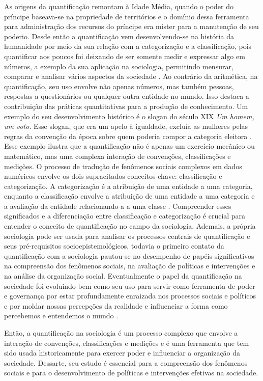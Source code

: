As origens da quantificação remontam à Idade Média, quando o poder do príncipe baseava-se na propriedade de territórios e o domínio dessa ferramenta para administração dos recursos do príncipe era mister para a manutenção de seu poderio. Desde então a quantificação vem desenvolvendo-se na história da humanidade por meio da sua relação com a categorização e a classificação, pois quantificar aos poucos foi deixando de ser somente medir e expressar algo em números, a exemplo da sua aplicação na sociologia, permitindo mensurar, comparar e analisar vários aspectos da sociedade \cite{camargo2021social}. Ao contrário da aritmética, na quantificação, seu uso envolve não apenas números, mas também pessoas, respostas a questionários ou qualquer outra entidade no mundo. Isso destaca a contribuição das práticas quantitativas para a produção de conhecimento. Um exemplo do seu desenvolvimento histórico é o slogan do século XIX \emph{Um homem, um voto}. Esse slogan, que era um apelo à igualdade, excluía as mulheres pelas regras da convenção da época sobre quem poderia compor a categoria eleitora \cite{berman2018sociology}. Esse exemplo ilustra que a quantificação não é apenas um exercício mecânico ou matemático, mas uma complexa interação de convenções, classificações e medições. O processo de tradução de fenômenos sociais complexos em dados numéricos envolve os dois supracitados conceitos-chave: classificação e categorização. A categorização é a atribuição de uma entidade a uma categoria, enquanto a classificação envolve a atribuição de uma entidade a uma categoria e a avaliação da entidade relacionando-a a uma classe \cite{mennicken2019s}. Compreender esses significados e a diferenciação entre classificação e categorização é crucial para entender o conceito de quantificação no campo da sociologia. Ademais, a própria sociologia pode ser usada para analisar os processos centrais de quantificação e seus pré-requisitos socioepistemológicos, todavia o primeiro contato da quantificação com a sociologia pautou-se no desempenho de papéis significativos na compreensão dos fenômenos sociais, na avaliação de políticas e intervenções e na análise da organização social. Eventualmente o papel da quantificação na sociedade foi evoluindo bem como seu uso para servir como ferramenta de poder e governança por estar profundamente enraizada nos processos sociais e políticos e por moldar nossas percepções da realidade e influenciar a forma como percebemos e entendemos o mundo \cite{camargo2021social}.

Então, a quantificação na sociologia é um processo complexo que envolve a interação de convenções, classificações e medições e é uma ferramenta que tem sido usada historicamente para exercer poder e influenciar a organização da sociedade. Dessarte, seu estudo é essencial para a compreensão dos fenômenos sociais e para o desenvolvimento de políticas e intervenções efetivas na sociedade.


